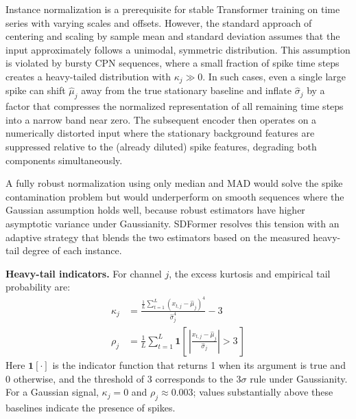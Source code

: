 \documentclass[journal]{IEEEtran}
\begin{document}
Instance normalization is a prerequisite for stable Transformer training on
time series with varying scales and offsets.
However, the standard approach of centering and scaling by sample mean and
standard deviation assumes that the input approximately follows a unimodal,
symmetric distribution.
This assumption is violated by bursty CPN sequences, where a small fraction
of spike time steps creates a heavy-tailed distribution with $\kappa_j \gg 0$.
In such cases, even a single large spike can shift $\hat{\mu}_j$ away from
the true stationary baseline and inflate $\hat{\sigma}_j$ by a factor that
compresses the normalized representation of all remaining time steps into a
narrow band near zero.
The subsequent encoder then operates on a numerically distorted input where
the stationary background features are suppressed relative to the
(already diluted) spike features, degrading both components simultaneously.

A fully robust normalization using only median and MAD would solve the
spike contamination problem but would underperform on smooth sequences
where the Gaussian assumption holds well, because robust estimators have
higher asymptotic variance under Gaussianity.
SDFormer resolves this tension with an adaptive strategy that blends the
two estimators based on the measured heavy-tail degree of each instance.

\textbf{Heavy-tail indicators.}
For channel $j$, the excess kurtosis and empirical tail probability are:
\begin{align}
\kappa_j &= \frac{\frac{1}{L}\sum_{t=1}^{L}(x_{t,j}-\hat{\mu}_j)^4}
                 {\hat{\sigma}_j^4} - 3 \label{eq:kurtosis} \\
\rho_j &= \frac{1}{L}\sum_{t=1}^{L}
  \mathbf{1}\!\left[\,\left|\frac{x_{t,j}-\hat{\mu}_j}{\hat{\sigma}_j}\right|
  > 3\,\right] \label{eq:indicators}
\end{align}
Here $\mathbf{1}[\cdot]$ is the indicator function that returns 1 when
its argument is true and 0 otherwise, and the threshold of 3 corresponds to
the $3\sigma$ rule under Gaussianity.
For a Gaussian signal, $\kappa_j = 0$ and $\rho_j \approx 0.003$;
values substantially above these baselines indicate the presence of spikes.
\end{document}
